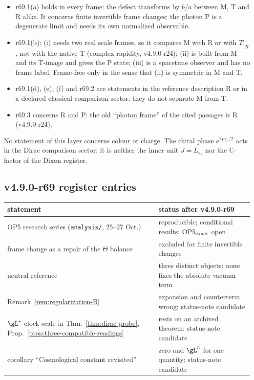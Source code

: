 \begin{itemize}[leftmargin=2em]
\item r69.1(a) holds in every frame: the defect transforms by \(b/a\) between M, T and R alike.  It concerns finite invertible frame changes; the
photon P is a degenerate limit and needs its own normalized observable.
\item r69.1(b): (i) needs two real scale frames, so it compares M with R or with \(T|_R\), not with the native T (complex rapidity, v4.9.0-r24); (ii) is built
from M and its T-image and gives the P state; (iii) is a spacetime observer and has no frame label.  Frame-free only in the sense that (ii) is symmetric
in M and T.
\item r69.1(d), (e), (f) and r69.2 are statements in the reference description R or in a declared classical comparison sector; they do not separate M
from T.
\item r69.3 concerns R and P: the old ``photon frame'' of the cited passages is R (v4.9.0-r24).
\end{itemize}
No statement of this layer concerns colour or charge.  The chiral phase \(e^{i\chi\gamma_5/2}\) acts in the Dirac comparison sector; it is neither the inner
unit \(J=L_{e_7}\) nor the \(\mathbb C\)-factor of the Dixon register.

\subsection*{v4.9.0-r69 register entries}
\label{subsec:v490-r69-register}

\begin{center}
\small
\begin{tabular}{@{}>{\raggedright\arraybackslash}p{}>{\raggedright\arraybackslash}p{}@{}}
\toprule
statement & status after v4.9.0-r69\\
\midrule
OP5 research series (\texttt{analysis/}, 25--27 Oct.) & reproducible; conditional results; OP5\(_{\rm exact}\) open\\
frame change as a repair of the \(\Theta\) balance & excluded for finite invertible changes\\
neutral reference & three distinct objects; none fixes the absolute vacuum term\\
Remark~\ref{rem:regularization-B} & expansion and counterterm wrong; status-note candidate\\
\(\gL^*\) clock scale in Thm.~\ref{thm:dirac-probe}, Prop.~\ref{prop:three-compatible-readings} & rests on an archived theorem; status-note candidate\\
corollary ``Cosmological constant revisited'' & zero and \(\gL^5\) for one quantity; status-note candidate\\
\bottomrule
\end{tabular}
\end{center}

